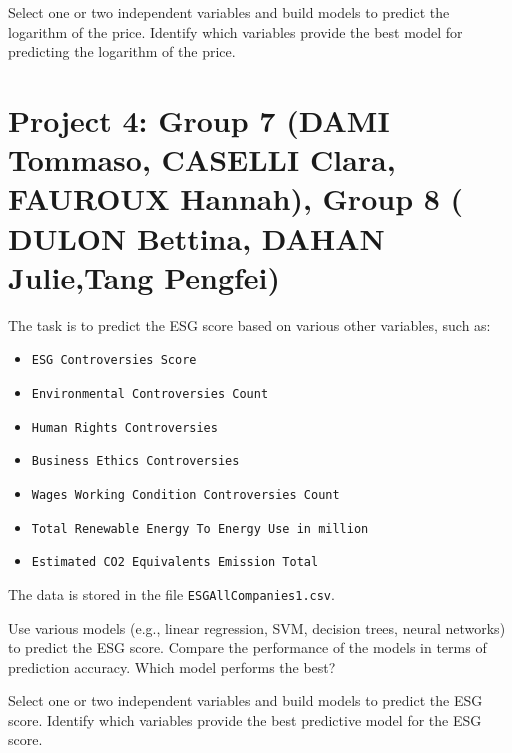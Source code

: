 \documentclass{article}
\begin{document}
Select one or two independent variables and build models to predict the logarithm of the price. Identify which variables provide the best model for predicting the logarithm of the price.



 \section*{Project 4:  Group 7 (DAMI Tommaso, CASELLI Clara, FAUROUX Hannah), Group  8 ( DULON Bettina, DAHAN Julie,Tang Pengfei) }
The task is to predict the ESG score based on various other variables, such as: \begin{itemize} \item \lstinline$ESG Controversies Score$ \item \lstinline$Environmental Controversies Count$ \item \lstinline$Human Rights Controversies$ \item \lstinline$Business Ethics Controversies$ \item \lstinline$Wages Working Condition Controversies Count$ \item \lstinline$Total Renewable Energy To Energy Use in million$ \item \lstinline$Estimated CO2 Equivalents Emission Total$ \end{itemize}

The data is stored in the file \lstinline$ESGAllCompanies1.csv$.

Use various models (e.g., linear regression, SVM, decision trees, neural networks) to predict the ESG score. Compare the performance of the models in terms of prediction accuracy. Which model performs the best?

Select one or two independent variables and build models to predict the ESG score. Identify which variables provide the best predictive model for the ESG score. 
\end{document}
